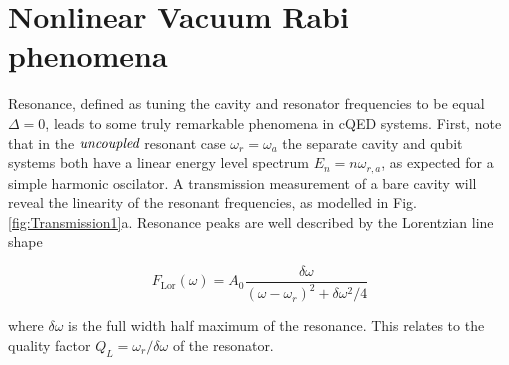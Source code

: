 \documentclass[11 pt, oneside]{book} %
\begin{document}

\section{Nonlinear Vacuum Rabi phenomena}\label{sec:Rabi}
Resonance, defined as tuning the cavity and resonator frequencies to be equal $\Delta=0$, leads to some truly remarkable phenomena in cQED systems. First, note that in the $\emph{uncoupled}$ resonant case $\omega_r=\omega_a$ the separate cavity and qubit systems both have a linear energy level spectrum $E_n=n\omega_{r,a}$, as expected for a simple harmonic oscilator. A transmission measurement of a bare cavity will reveal the linearity of the resonant frequencies, as modelled in Fig. \ref{fig:Transmission1}a. Resonance peaks are well described by the Lorentzian line shape

\begin{equation}
F_{\mathrm{Lor}}(\omega)=A_0\frac{\delta \omega}{(\omega-\omega_r)^2+\delta \omega^2/4}
\end{equation}

where $\delta \omega$ is the full width half maximum of the resonance. This relates to the quality factor $Q_L=\omega_r/\delta\omega$ of the resonator. 
\end{document}

